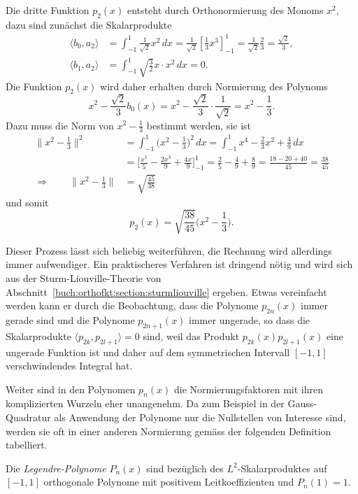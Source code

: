 Die dritte Funktion $p_2(x)$ entsteht durch Orthonormierung des
Monoms $x^2$, dazu sind zunächst die Skalarprodukte
\begin{align*}
\langle b_0,a_2\rangle
&=
\int_{-1}^1 \frac{1}{\sqrt{2}}x^2\,dx
=
\frac{1}{\sqrt{2}} [\frac13x^3]_{-1}^1
=
\frac{1}{\sqrt{2}} \frac{2}{3}
=
\frac{\sqrt{2}}{3},
\\
\langle b_1,a_2\rangle
&=
\int_{-1}^1 \sqrt{\frac{3}{2}} x \cdot x^2\,dx
= 
0.
\end{align*}
Die Funktion $p_2(x)$ wird daher erhalten durch Normierung des Polynoms
\[
x^2 - 
\frac{\sqrt{2}}{3} b_0(x)
=
x^2-
\frac{\sqrt{2}}{3}\cdot\frac{1}{\sqrt{2}}
=
x^2-\frac13.
\]
Dazu muss die Norm von $x^2-\frac13$ bestimmt werden, sie ist
\begin{align*}
\|x^2-\frac13\|^2
&=
\int_{-1}^1 \biggl(x^2-\frac13\biggr)^2\,dx
=
\int_{-1}^1 x^4-\frac23x^2+\frac{4}{9}\,dx
\\
&=
\biggl[\frac{x^5}{5} -\frac{2x^3}{9}+\frac{4x}{9}\biggr]_{-1}^1
=
\frac{2}{5} - \frac{4}{9} + \frac{8}{9}
=
\frac{18-20+40}{45}
=
\frac{38}{45}
\\
\Rightarrow\qquad
\|x^2-\frac13\|
&=
\sqrt{\frac{45}{38}}
\end{align*}
und somit
\[
p_2(x)
= 
\sqrt{\frac{38}{45}} \biggl(x^2-\frac13\biggr).
\]

Dieser Prozess lässt sich beliebig weiterführen, die Rechnung wird
allerdings immer aufwendiger.
Ein praktischeres Verfahren ist dringend nötig und wird sich
aus der Sturm-Liouville-Theorie von
Abschnitt~\ref{buch:orthofkt:section:sturmliouville} ergeben.
Etwas vereinfacht werden kann er durch die Beobachtung, dass die
Polynome $p_{2n}(x)$ immer gerade sind und die Polynome $p_{2n+1}(x)$
immer ungerade, so dass die Skalarprodukte 
$\langle p_{2k},p_{2l+1}\rangle=0$ sind, weil das Produkt
$p_{2k}(x)p_{2l+1}(x)$ eine ungerade Funktion ist und daher auf
dem symmetrischen Intervall $[-1,1]$ verschwindendes Integral hat.

Weiter sind in den Polynomen $p_n(x)$ die Normierungsfaktoren mit
ihren komplizierten Wurzeln eher unangenehm.
Da zum Beispiel in der Gauss-Quadratur als Anwendung der Polynome
nur die Nullstellen von Interesse sind, werden sie oft in einer
anderen Normierung gemäss der folgenden Definition tabelliert.

\begin{definition}
Die {\em Legendre-Polynome} $P_n(x)$ sind bezüglich des $L^2$-Skalarproduktes 
auf $[-1,1]$ orthogonale Polynome mit positivem Leitkoeffizienten und
$P_n(1)=1$.
\end{definition}

